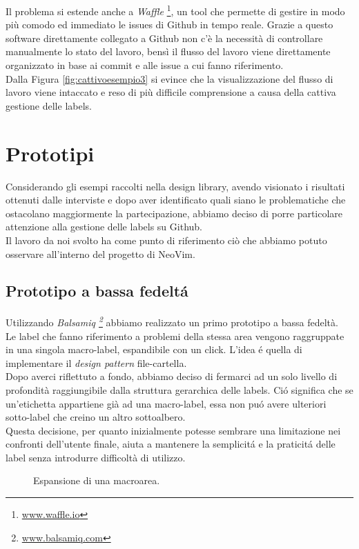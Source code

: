 \documentclass[12pt]{article} %
\begin{document}
Il problema si estende anche a \emph{Waffle} \footnote{\url{www.waffle.io}}, un tool che permette di gestire in modo pi\`u comodo ed immediato le issues di Github in tempo reale. Grazie a questo software direttamente collegato a Github non c'è la necessit\`a di controllare manualmente lo stato del lavoro, bensì il flusso del lavoro viene direttamente organizzato in base ai commit e alle issue a cui fanno riferimento.\\
Dalla Figura \ref{fig:cattivoesempio3} si evince che la visualizzazione del flusso di lavoro viene intaccato e reso di più difficile comprensione a causa della cattiva gestione delle labels. 
\newpage

\section{Prototipi}
Considerando gli esempi raccolti nella design library, avendo visionato i risultati ottenuti dalle interviste e dopo aver identificato quali siano le problematiche che ostacolano maggiormente la partecipazione, abbiamo deciso di porre particolare attenzione alla gestione delle labels su Github.\\
Il lavoro da noi svolto ha come punto di riferimento ci\`o che abbiamo potuto osservare all'interno del progetto di NeoVim.
\subsection{Prototipo a bassa fedelt\'a}
Utilizzando \emph{Balsamiq \footnote{\url{www.balsamiq.com}}} abbiamo realizzato un primo prototipo a bassa fedelt\`a.\\
Le label che fanno riferimento a problemi della stessa area vengono raggruppate in una singola macro-label, espandibile con un click. L'idea \'e quella di implementare il \emph{design pattern} file-cartella.\\ 
Dopo averci riflettuto a fondo, abbiamo deciso di fermarci ad un solo livello di profondit\`a raggiungibile dalla struttura gerarchica delle labels. Ci\'o significa che se un'etichetta appartiene gi\`a ad una macro-label, essa non pu\'o avere ulteriori sotto-label che creino un altro sottoalbero.\\
Questa decisione, per quanto inizialmente potesse sembrare una limitazione nei confronti dell'utente finale, aiuta a mantenere la semplicit\'a e la praticit\'a delle label senza introdurre difficolt\`a di utilizzo.

\begin{figure}[H] 
\caption{Espansione di una macroarea.}
\label{fig:low_prototype}
\end{figure}
\end{document}
